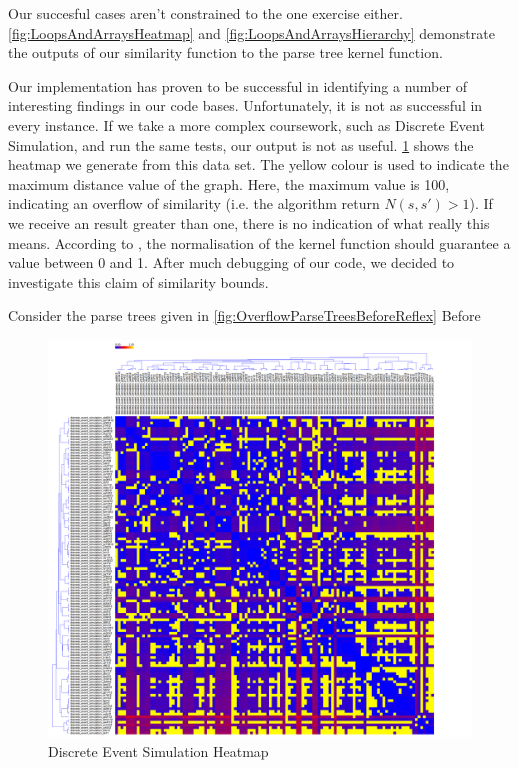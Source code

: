 Our succesful cases aren't constrained to the one exercise either. 
\cref{fig:LoopsAndArraysHeatmap} and \cref{fig:LoopsAndArraysHierarchy}
demonstrate the outputs of our similarity function to the parse tree kernel
function.

Our implementation has proven to be successful in identifying a number of
interesting findings in our code bases. Unfortunately, it is not as successful
in every instance. If we take a more complex coursework, such as Discrete
Event Simulation, and run the same tests, our output is not as useful. 
\cref{fig:DESHeatmap} shows the heatmap we generate from this data set. The
yellow colour is used to indicate the maximum distance value of the graph. Here,
the maximum value is 100, indicating an overflow of similarity (i.e. the algorithm
return $N(s, s') > 1$). If we receive an result greater than one, there is no
indication of what really this means. According to \cite{ParseTreeKernel},
the normalisation of the kernel function should guarantee a value between 0
and 1. After much debugging of our code, we decided to investigate this claim
of similarity bounds. 

Consider the parse trees given in \cref{fig:OverflowParseTreesBeforeReflex}
Before 

\begin{figure}[H]

	\centering
		\includegraphics[width=1.2\textwidth]{Figures/DESHeatmapOverflow}
	\caption{Discrete Event Simulation Heatmap}
	\label{fig:DESHeatmap}

\end{figure}

